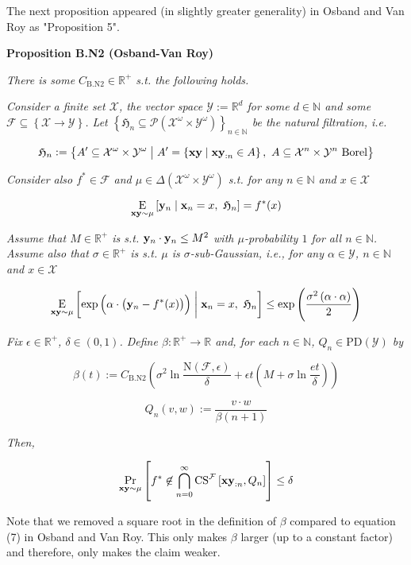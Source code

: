 \documentclass[a4paper]{article}
\newcommand{\Co}[1]{}
\newcommand{\AP}[1]{\left(#1\right)}
\newcommand{\AB}[1]{\left[#1\right]}
\newcommand{\AC}[1]{\left\{#1\right\}}
\newcommand{\ABM}[2]{\left[#1\;\middle\vert\;#2\right]}
\newcommand{\ACM}[2]{\left\{#1\;\middle\vert\;#2\right\}}
\newcommand{\Pa}[2]{\underset{#1}{\operatorname{Pr}}\AB{#2}}
\newcommand{\CE}[3]{\underset{#1}{\operatorname{E}}\ABM{#2}{#3}}
\newcommand{\PS}[1]{\mathcal{P}\AP{#1}}
\newcommand{\Nats}{\mathbb{N}}
\newcommand{\Reals}{\mathbb{R}}
\newcommand{\PD}{\mathrm{PD}}
\newcommand{\X}{\mathcal{X}}
\newcommand{\Y}{\mathcal{Y}}
\newcommand{\F}{\mathcal{F}}
\newcommand{\N}{\mathrm{N}}
\newcommand{\CS}{\mathrm{CS}}
\begin{document}
The next proposition appeared (in slightly greater generality) in Osband and Van Roy as "Proposition 5".

\textbf{Proposition B.N2 (Osband-Van Roy)}\Co{b}

\textit{There is some $C_{\mathrm{B.N2}}\in\Reals^+$ s.t. the following holds.}\Co{i}

\textit{Consider a finite set $\X$, the vector space $\Y:=\Reals^d$ for some $d\in\Nats$ and some $\F\subseteq\AC{\X\rightarrow\Y}$. Let $\AC{\mathfrak{H}_n\subseteq\PS{\X^\omega\times\Y^\omega}}_{n\in\Nats}$ be the natural filtration, i.e.}\Co{i}

$$\mathfrak{H}_n:=\ACM{A'\subseteq\X^\omega\times\Y^\omega}{A'=\ACM{\bold{xy}}{\bold{xy}_{:n}\in A},\ A\subseteq\X^n\times\Y^n\text{ Borel}}$$

\textit{Consider also $f^*\in\F$ and $\mu\in\Delta\AP{\X^\omega\times\Y^\omega}$ s.t. for any $n\in\Nats$ and $x\in\X$}\Co{i}

$$\CE{\bold{xy}\sim\mu}{\bold{y}_n}{\bold{x}_n=x,\ \mathfrak{H}_n} = f^*(x)$$

\textit{Assume that $M\in\Reals^+$ is s.t. $\bold{y}_n\cdot\bold{y}_n\leq M^2$ with $\mu$-probability $1$ for all $n\in\Nats$. Assume also that $\sigma\in\Reals^+$ is s.t. $\mu$ is $\sigma$-sub-Gaussian, i.e., for any $\alpha\in\Y$, $n\in\Nats$ and $x\in\X$}\Co{i}

$$\CE{\bold{xy}\sim\mu}{\exp\AP{\alpha\cdot\AP{\bold{y}_n-f^*(x)}}}{\bold{x}_n=x,\ \mathfrak{H}_n} \leq \exp\AP{\frac{\sigma^2\AP{\alpha\cdot\alpha}}{2}}$$

\textit{Fix $\epsilon\in\Reals^+$, $\delta\in(0,1)$. Define $\beta:\Reals^+\rightarrow\Reals$ and, for each $n\in\Nats$, $Q_n\in\PD(\Y)$ by}\Co{i}

$$\beta(t):=C_{\mathrm{B.N2}}\AP{\sigma^2 \ln{\frac{\N(\F,\epsilon)}{\delta}}+\epsilon t\AP{M+\sigma\ln{\frac{et}{\delta}}}}$$

$$Q_n(v,w):=\frac{v\cdot w}{\beta(n+1)}$$

\textit{Then,}\Co{i}

$$\Pa{\bold{xy}\sim\mu}{f^*\not\in\bigcap_{n=0}^\infty\CS^\F\AB{\bold{xy}_{:n},Q_n}} \leq \delta$$

Note that we removed a square root in the definition of $\beta$ compared to equation (7) in Osband and Van Roy. This only makes $\beta$ larger (up to a constant factor) and therefore, only makes the claim weaker.
\end{document}
